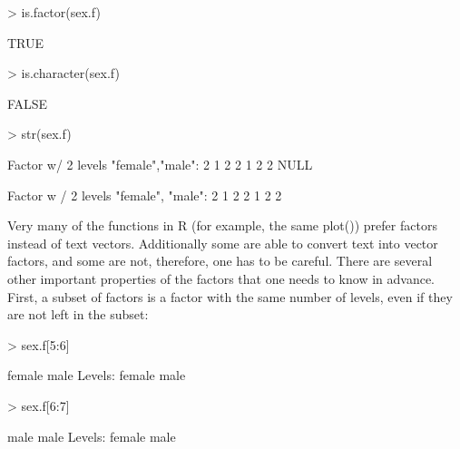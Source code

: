 \documentclass[a4paper,11pt]{scrartcl}
\begin{document}
\begin{Schunk}
\begin{Sinput}
> is.factor(sex.f)
\end{Sinput}
\begin{Soutput}
[1] TRUE
\end{Soutput}
\begin{Sinput}
> is.character(sex.f)
\end{Sinput}
\begin{Soutput}
[1] FALSE
\end{Soutput}
\begin{Sinput}
> str(sex.f)
\end{Sinput}
\begin{Soutput}
 Factor w/ 2 levels "female","male": 2 1 2 2 1 2 2
NULL
\end{Soutput}
\end{Schunk}
Factor w / 2 levels "female", "male": 2 1 2 2 1 2 2

Very many of the functions in R (for example, the same plot()) prefer factors instead of text vectors. Additionally some are able to convert text into vector factors, and some are not, therefore, one has to be careful.
There are several other important properties of the factors that one needs to know in advance. First, a subset of factors is a factor with the same number of levels, even if they are not left in the subset:

\begin{Schunk}
\begin{Sinput}
> sex.f[5:6]
\end{Sinput}
\begin{Soutput}
[1] female male  
Levels: female male
\end{Soutput}
\begin{Sinput}
> sex.f[6:7]
\end{Sinput}
\begin{Soutput}
[1] male male
Levels: female male
\end{Soutput}
\end{Schunk}
\end{document}

